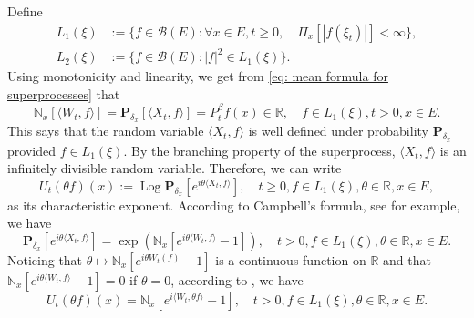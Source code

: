 \documentclass[UTF8]{pkuthss}
\theoremstyle{plain}
\theoremstyle{definition}
\numberwithin{equation}{section}
\begin{document}
    Define
\begin{align}
    L_1(\xi)
    &:= \{f\in \mathcal B(E): \forall x\in E, t\geq 0, \quad \Pi_x[|f(\xi_t)|]< \infty\},
    \\L_2(\xi)
    &:= \{f \in \mathcal B(E): |f|^2 \in L_1(\xi)\}.
\end{align}
    Using monotonicity and linearity, we get from \eqref{eq: mean formula for superprocesses}  that
\begin{equation}
   \mathbb N_x[\langle W_t, f\rangle]   
    =\mathbf P_{\delta_x}[\langle X_t,f\rangle]
    =P^{\beta}_t f(x) \in \mathbb R,
    \quad f\in L_1(\xi), t > 0,x\in E.
\end{equation}
    This says that the random variable $\langle X_t, f\rangle$ is well defined under probability $\mathbf P_{\delta_x}$ provided $f\in L_1(\xi)$.
    By the branching property of the superprocess, $\langle X_t, f\rangle$ is an infinitely divisible random variable.
    Therefore, we can write
\[
    U_t(\theta f)(x) := \operatorname{Log} \mathbf P_{\delta_x}[e^{i \theta \langle X_t, f\rangle}],
    \quad t\geq 0, f\in L_1(\xi), \theta \in \mathbb R, x\in E,
\]
    as its characteristic exponent.
    According to Campbell's formula, see \cite[Theorem 2.7]{Kyprianou2014Fluctuations} for example, we have
\[
    \mathbf P_{\delta_x} [e^{i\theta \langle X_t, f\rangle}]
    = \exp(\mathbb N_x[ e^{i\theta \langle W_t, f\rangle} - 1]),
    \quad t>0, f\in L_1(\xi), \theta \in \mathbb R, x\in E.
\]
    Noticing that $\theta \mapsto \mathbb N_x[e^{i\theta W_t(f)} - 1]$ is a continuous function on $\mathbb R$ and that $\mathbb N_x[e^{i\theta \langle W_t, f\rangle} - 1] = 0$ if $\theta = 0$, according to \cite[Lemma 7.6]{Sato2013Levy}, we have
\begin{equation}
\label{eq: N and characteristic exponent}
    U_t(\theta f)(x) = \mathbb N_x[e^{i \langle W_t, \theta f\rangle} - 1],
    \quad t>0, f\in L_1(\xi), \theta \in \mathbb R, x\in E.
\end{equation}
\end{document}
